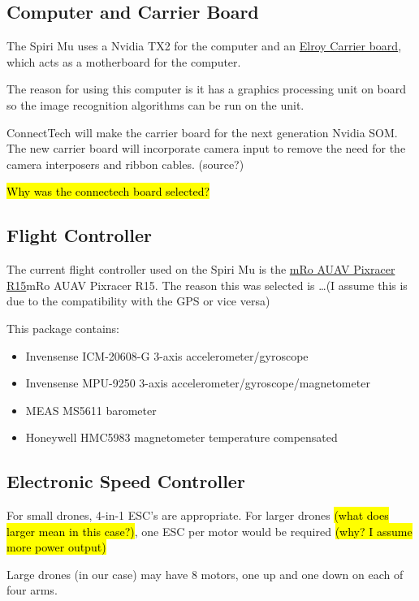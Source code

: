 \subsection{Computer and Carrier Board}
The Spiri Mu uses a Nvidia TX2 for the computer and an \href{http://connecttech.com/product/asg002-elroy-carrier-for-nvidia-jetson-tx2-tx1/}{Elroy Carrier board}, which acts as a motherboard for the computer.

The reason for using this computer is it has a graphics processing unit on board so the image recognition algorithms can be run on the unit. 

ConnectTech will make the carrier board for the next generation Nvidia SOM. The new carrier board will incorporate camera input to remove the need for the camera interposers and ribbon cables. (source?)

\hl{Why was the connectech board selected?}

\subsection{Flight Controller}
The current flight controller used on the Spiri Mu is the \href{https://store.mrobotics.io/mRo-PixRacer-R14-Official-p/auav-pxrcr-r14-mr.htm}{mRo AUAV Pixracer R15}mRo AUAV Pixracer R15. The reason this was selected is …(I assume this is due to the compatibility with the GPS or vice versa)

This package contains:

\begin{itemize}
	\setlength{\itemsep}{0pt}%
	\setlength{\parskip}{-6pt}%
	\item Invensense ICM-20608-G 3-axis accelerometer/gyroscope
	\item Invensense MPU-9250 3-axis accelerometer/gyroscope/magnetometer 
	\item MEAS MS5611 barometer
	\item Honeywell HMC5983 magnetometer temperature compensated
\end{itemize}

\subsection{Electronic Speed Controller}
For small drones,  4-in-1 ESC's are appropriate. For larger drones \hl{(what does larger mean in this case?)}, one ESC per motor would be required \hl{(why? I assume more power output)} 

Large drones (in our case) may have 8 motors, one up and one down on each of four arms.


